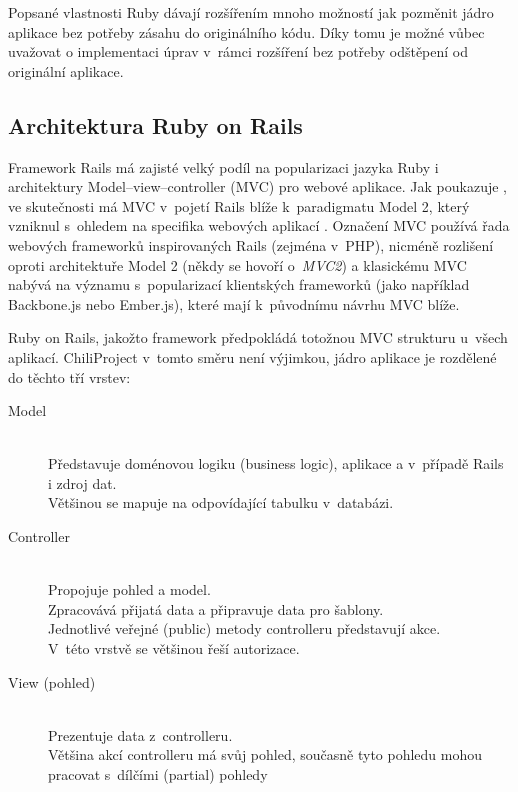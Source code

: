 \documentclass[thesis=B,czech]{FITthesis}[2012/05/02]
\begin{document}
Popsané vlastnosti Ruby dávají rozšířením mnoho možností jak pozměnit jádro
aplikace bez potřeby zásahu do originálního kódu. Díky tomu je možné
vůbec uvažovat o implementaci úprav v~rámci rozšíření bez potřeby
odštěpení od originální aplikace.

\subsection{Architektura Ruby on Rails}

Framework Rails má zajisté velký podíl na popularizaci jazyka Ruby i
architektury Model--view--controller (MVC) pro webové aplikace. Jak
poukazuje \citep{Krzywda2011}, ve skutečnosti má MVC v~pojetí Rails
blíže k~paradigmatu Model 2, který vzniknul s~ohledem na specifika
webových aplikací \citep{McCallister2004}. Označení MVC používá řada
webových frameworků inspirovaných Rails (zejména v~PHP), nicméně
rozlišení oproti architektuře Model 2 (někdy se hovoří o~\emph{MVC2}) a
klasickému MVC nabývá na významu s~popularizací klientských frameworků
(jako například Backbone.js nebo Ember.js), které mají k~původnímu
návrhu MVC blíže.

Ruby on Rails, jakožto  framework \citep[kpt. 4, Make
Opinionated Software]{Fried2009}
předpokládá totožnou MVC strukturu u~všech aplikací. ChiliProject
v~tomto směru není výjimkou, jádro aplikace je rozdělené do těchto tří vrstev:

\begin{description}
\item[Model] \hfill \\
Představuje doménovou logiku (business logic), aplikace a v~případě Rails i zdroj dat. \hfill \\
Většinou se mapuje na odpovídající tabulku v~databázi.
\item[Controller] \hfill \\
Propojuje pohled a model. \hfill \\
Zpracovává přijatá data a připravuje data pro šablony. \hfill \\
Jednotlivé veřejné (public) metody controlleru představují akce. \hfill \\
V~této vrstvě se většinou řeší autorizace.
\item[View (pohled)] \hfill \\
Prezentuje data z~controlleru. \hfill \\
Většina akcí controlleru má svůj pohled, současně tyto pohledu mohou pracovat s~dílčími (partial) pohledy
\end{description}
\end{document}
